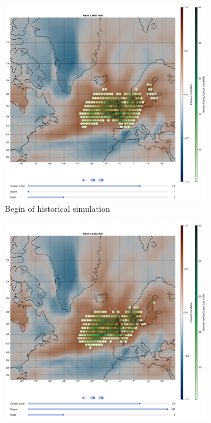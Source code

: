 \begin{figure}[!htb]
  \begin{subfigure}[b]{0.49\textwidth}
    \includegraphics[width=\textwidth]{figures/ivt_pr_cor_mode2_historical_hexbin.png}
    \caption{Begin of historical simulation}
    \label{fig:ivt eof pr cor historical mode2}
  \end{subfigure}
  \hfill
  \begin{subfigure}[b]{0.49\textwidth}
    \includegraphics[width=\textwidth]{figures/ivt_pr_cor_mode2_ssp126_hexbin.png}

\end{subfigure}
\end{figure}
